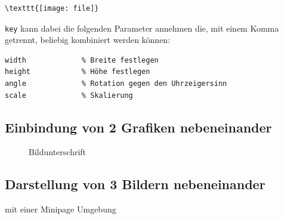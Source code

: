 \documentclass{like}
\begin{document}
\qquad\begin{minipage}{0.8\textwidth}
\begin{verbatim}
\texttt{[image: file]}
\end{verbatim}
\end{minipage}\par\bigskip
\verb+key+ kann dabei die folgenden Parameter annehmen die, mit einem Komma getrennt, beliebig kombiniert werden können:\nopagebreak\par\medskip\nopagebreak
\qquad\begin{minipage}{0.8\textwidth}
\begin{verbatim}
width             % Breite festlegen
height            % Höhe festlegen
angle             % Rotation gegen den Uhrzeigersinn
scale             % Skalierung 
\end{verbatim}
\end{minipage}\par\bigskip

 \subsection{Einbindung von 2 Grafiken nebeneinander}
  \begin{figure}[ht!]
  \begin{centering}
  \hspace*{1cm}
 \caption{Bildunterschrift}
  \end{centering}
  \end{figure}
\subsection{Darstellung von 3 Bildern nebeneinander}
mit einer Minipage Umgebung
\end{document}
